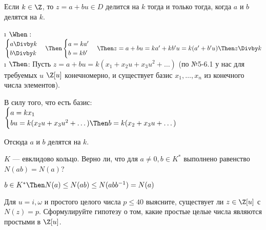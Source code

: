 \begin{problem}[11 (2.5)]
Если $k \in \Z$, то $z= a+bu \in D$ делится на $k$ тогда и только тогда, когда $a$ и $b$ делятся на $k$.
\end{problem}
\begin{solution}
\begin{itemize}
\i
  \(\When:\)
  \(\begin{cases} a \Divby k \\ b \Divby k \end{cases} \Then \begin{cases} a = ka' \\ b = kb' \end{cases} \Then z = a+bu = ka'+kb'u=k(a'+b'u) \Then z \Divby k\)
\i
  \(\Then\):
  Пусть \(z = a + bu = k(x_1+x_2u+x_3u^2+\dots)\) (по №5-6.1 у нас для требуемых $u$ $\Z[u]$ конечномерно, и существует базис $x_1, \dots, x_n$ из конечного числа элементов).
  
  В силу того, что есть базис:
  $\begin{cases}
	a=kx_1\\
	bu=k(x_2u+x_3u^2+\dots) \Then b=k(x_2+x_3u+\dots)
  \end{cases}$
	
	Отсюда $a$ и $b$ делятся на $k$.
\end{itemize}

\end{solution}

\begin{problem}[12(2.9 $\When$)]
$K$ — евклидово кольцо. Верно ли, что для $a \ne 0, b \in K^*$ выполнено равенство $N(ab) = N(a)$?
\end{problem}

\begin{solution}
\(b \in K^* \Then N(a) \le N(ab) \le N(abb^{-1}) = N(a)\)
\end{solution}

\begin{problem}[13 (3.2)]
Для $u=i,\omega$ и простого целого числа $p \leq 40$ выясните, существует ли $z \in \Z[u]$ с $N(z)=p$. Сформулируйте гипотезу о том, какие простые целые числа являются простыми в $\Z[u]$. 
\end{problem}

